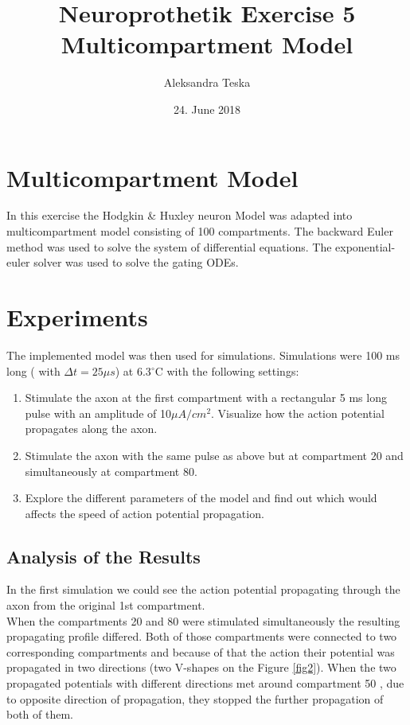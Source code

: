\documentclass{scrartcl}			%
\title{Neuroprothetik Exercise 5 \\\textsl{}
	Multicompartment Model}
\author{Aleksandra Teska}
\date{24. June 2018}
\begin{document}

\maketitle
\section{Multicompartment Model}

In this exercise the Hodgkin \& Huxley  neuron Model was adapted into multicompartment model consisting of 100 compartments. The backward Euler method was used to solve the system of differential equations. The exponential-euler solver was used to solve the gating ODEs.

\section{Experiments}		%
The implemented model was then used for simulations. Simulations were 100 ms long ( with ${\Delta t = 25 \mu s}$) at 6.3$^{\circ}$C with the following settings:

\begin{enumerate}
	\item Stimulate the axon at the first compartment with a rectangular 5 ms long pulse with an amplitude of 10$\mu A/cm^2$. Visualize how the action potential propagates along the axon.
	\item Stimulate the axon with the same pulse as above but at compartment 20 and simultaneously at compartment 80. 
	\item Explore the different parameters of the model and find out which would affects the speed of action potential propagation.
\end{enumerate}

\subsection{Analysis of the Results}
In the first simulation we could see the action potential propagating through the axon from the original 1st compartment. \\

When the compartments 20 and 80 were stimulated simultaneously the resulting propagating profile differed.
Both of those compartments were connected to two corresponding compartments and because of that the action their potential was propagated in two directions (two V-shapes on the Figure \ref{fig2}). When the two propagated potentials with different directions met around compartment 50 , due to opposite direction of propagation, they stopped the further propagation of both of them.\\
\end{document}
